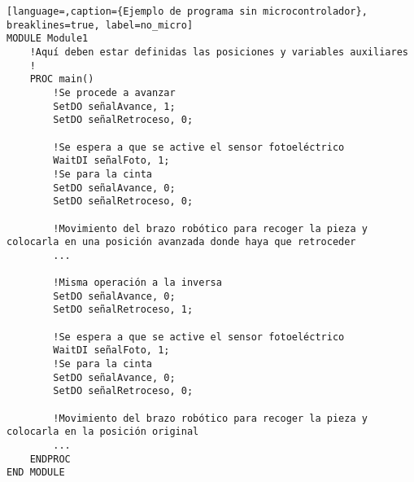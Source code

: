 \begin{lstlisting}[language=,caption={Ejemplo de programa sin microcontrolador}, breaklines=true, label=no_micro]
MODULE Module1
    !Aquí deben estar definidas las posiciones y variables auxiliares
    !
    PROC main()
        !Se procede a avanzar 
        SetDO señalAvance, 1;
        SetDO señalRetroceso, 0;

        !Se espera a que se active el sensor fotoeléctrico
        WaitDI señalFoto, 1;
        !Se para la cinta
        SetDO señalAvance, 0;
        SetDO señalRetroceso, 0;
        
        !Movimiento del brazo robótico para recoger la pieza y colocarla en una posición avanzada donde haya que retroceder
        ...

        !Misma operación a la inversa
        SetDO señalAvance, 0;
        SetDO señalRetroceso, 1;

        !Se espera a que se active el sensor fotoeléctrico
        WaitDI señalFoto, 1;
        !Se para la cinta
        SetDO señalAvance, 0;
        SetDO señalRetroceso, 0;

        !Movimiento del brazo robótico para recoger la pieza y colocarla en la posición original
        ...
    ENDPROC
END MODULE
\end{lstlisting}
    